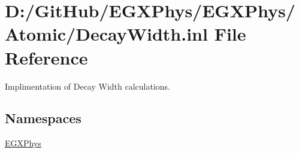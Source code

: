 \hypertarget{_decay_width_8inl}{}\section{D\+:/\+Git\+Hub/\+E\+G\+X\+Phys/\+E\+G\+X\+Phys/\+Atomic/\+Decay\+Width.inl File Reference}
\label{_decay_width_8inl}


Implimentation of Decay Width calculations.  


\subsection*{Namespaces}
\begin{DoxyCompactItemize}
\item 
 \mbox{\hyperlink{namespace_e_g_x_phys}{E\+G\+X\+Phys}}
\end{DoxyCompactItemize}
